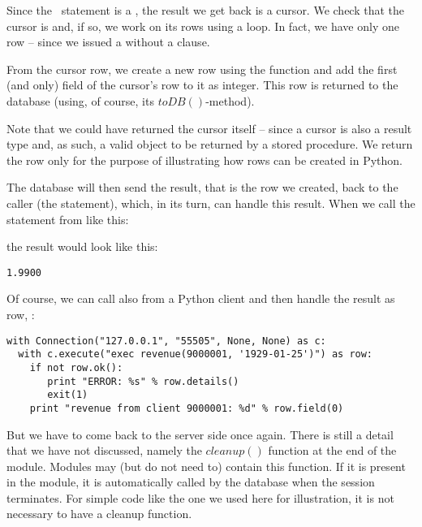 Since the \sql\ statement
is a , the result we get
back is a cursor. We check that the cursor
is  and, if so, we work on
its rows using a  loop.
In fact, we have only
one row -- since we issued a 
without a  clause.

From the cursor row, we create a new row
using the  function
and add the first (and only) field 
of the cursor's row to it as integer. This row
is returned to the database (using,
of course, its $toDB()$-method).

Note that we could have returned the cursor itself --
since a cursor is also a result type and, as such,
a valid object to be returned by a stored procedure.
We return the row only for the purpose of illustrating
how rows can be created in Python.

The database will then send the result,
that is the row we created,
back to the caller (the  statement),
which, in its turn, can handle this result.
When we call the  statement
from  like this:


the result would look like this:
\begin{verbatim}
1.9900
\end{verbatim}

\begin{minipage}{\textwidth}
Of course, we can call 
also from a Python client and then handle
the result as row, \eg:

\begin{python}
\begin{lstlisting}
with Connection("127.0.0.1", "55505", None, None) as c:
  with c.execute("exec revenue(9000001, '1929-01-25')") as row:
    if not row.ok():
       print "ERROR: %s" % row.details()
       exit(1)
    print "revenue from client 9000001: %d" % row.field(0)
\end{lstlisting}
\end{python}
\end{minipage}

But we have to come back to the server side once again.
There is still a detail that we have not discussed,
namely the $cleanup()$ function at the end of the module.
Modules may (but do not need to) contain this
function. If it is present in the module, it is automatically
called by the database when the session terminates.
For simple code like the one we used
here for illustration, it is not necessary to have a cleanup
function. 

